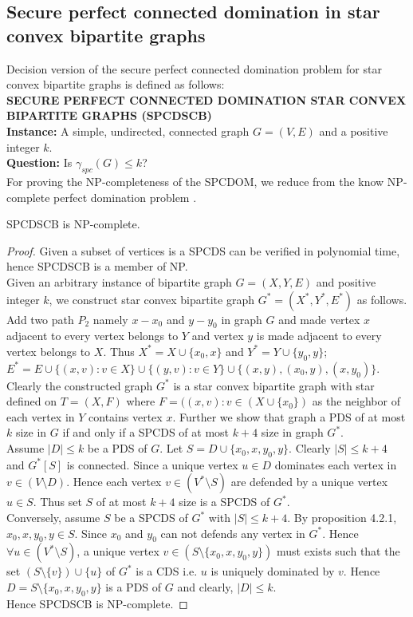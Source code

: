 \subsection{Secure perfect connected domination in star convex bipartite graphs}
\noindent 
Decision version of the secure perfect connected domination problem for star convex bipartite graphs is defined as follows:\\
\textbf{SECURE PERFECT CONNECTED DOMINATION STAR CONVEX BIPARTITE GRAPHS (SPCDSCB)}\\
\indent \textbf{Instance:} A simple, undirected, connected graph $G=(V,E)$ and a positive integer $k$.\\
\indent \textbf{Question:} Is $\gamma_{spc}(G) \leq k$?\\
For proving the NP-completeness of the SPCDOM, we reduce from the know NP-complete perfect domination problem \cite{Yen}.
\begin{theorem}
SPCDSCB is NP-complete.
\begin{proof}
Given a subset of vertices is a SPCDS can be verified in polynomial time, hence SPCDSCB is a member of NP.\\
Given an arbitrary instance of bipartite graph $G=(X,Y,E)$ and positive integer $k$, we construct star convex bipartite graph $G^*=(X^*, Y^*, E^*)$ as follows. Add two path $P_2$ namely $x-x_0$ and $y-y_0$ in graph $G$ and made vertex $x$ adjacent to every vertex belongs to $Y$ and vertex $y$ is made adjacent to every vertex belongs to $X$. Thus $X^*=X \cup \lbrace x_0,x \rbrace$ and $Y^*=Y \cup \lbrace y_0,y \rbrace$; $E^*=E \cup \lbrace (x,v): v \in X \rbrace \cup \lbrace (y,v): v \in Y \rbrace \cup \lbrace (x,y),(x_0,y), (x,y_0) \rbrace$. Clearly the constructed graph $G^*$ is a star convex bipartite graph with star defined on $T=(X,F)$ where $F=((x,v):v \in (X \cup \lbrace x_0 \rbrace)$ as the neighbor of each vertex in $Y$ contains vertex $x$. Further we show that graph a PDS of at most $k$ size in $G$ if and only if a SPCDS of at most $k+4$ size in graph $G^*$.\smallskip \\
Assume $|D| \leq k$ be a PDS of $G$. Let $S=D \cup \lbrace x_0,x,y_0,y \rbrace$. Clearly $|S| \leq k+4$ and $G^*[S]$ is connected. Since a unique vertex $u \in D$ dominates each vertex in $v \in (V \setminus D)$. Hence each vertex $v \in (V^*\setminus S)$ are defended by a unique vertex $u \in S$. Thus set $S$ of at most $k+4$ size is a SPCDS of $G^*$.\smallskip \\
Conversely, assume $S$ be a SPCDS of $G^*$ with $|S| \leq k+4$. By proposition 4.2.1, $x_0,x,y_0,y \in S$. Since $x_0$ and $y_0$ can not defends any vertex in $G^*$. Hence $\forall u \in (V^*\setminus S)$, a unique vertex $v \in (S\setminus \lbrace x_0,x,y_0,y \rbrace) $ must exists such that the set $(S \setminus \lbrace v \rbrace) \cup \lbrace u \rbrace$ of $G^*$ is a CDS i.e. $u$ is uniquely dominated by $v$. Hence $D = S \setminus \lbrace x_0,x,y_0,y \rbrace$ is a PDS of $G$ and clearly, $|D| \leq k$.\\
Hence SPCDSCB is NP-complete.
\end{proof}
\end{theorem}